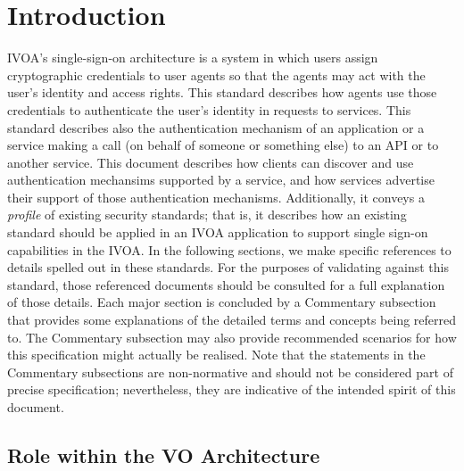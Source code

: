 \documentclass[11pt,a4paper]{ivoa}
\begin{document}
\section{Introduction}
IVOA's single-sign-on architecture is a system in which users assign cryptographic credentials to user agents so that the agents may act with the user's identity and access rights. This standard describes how agents use those credentials to authenticate the user's identity in requests to services. This standard describes also the authentication mechanism of an application or a service making a call (on behalf of someone or something else) to an API or to another service.
This document describes how clients can discover and use authentication mechansims supported by a service, and how services advertise their support of those authentication mechanisms. Additionally, it conveys a {\em profile} of existing security standards; that is, it describes how an existing standard should be applied in an IVOA application to support single sign-on capabilities in the IVOA. In the following sections, we make specific references to details spelled out in these standards. For the purposes of validating against this standard, those referenced documents should be consulted for a full explanation of those details. Each major section is concluded by a Commentary subsection that provides some explanations of the detailed terms and concepts being referred to. The Commentary subsection may also provide recommended scenarios for how this specification might actually be realised. Note that the statements in the Commentary subsections are non-normative and should not be considered part of precise specification; nevertheless, they are indicative of the intended spirit of this document.

\subsection{Role within the VO Architecture}
\end{document}
